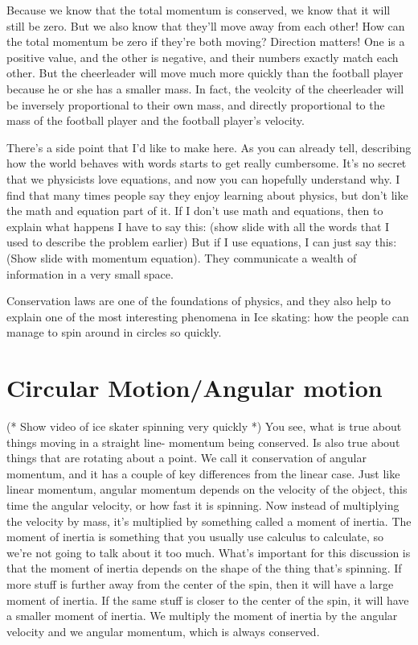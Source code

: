 \documentclass[12pt]{article}
\begin{document}
Because we know that the total momentum is conserved, we know that it will still be zero.
But we also know that they'll move away from each other! How can the total momentum be
zero if they're both moving? Direction matters! One is a positive value, and the other
is negative, and their numbers exactly match each other. 
But the cheerleader will move much more quickly
than the football player because he or she has a smaller mass. In fact, the veolcity 
of the cheerleader will be inversely proportional to their own mass, and directly 
proportional to the mass of the football player and the football player's velocity. 

There's a side point that I'd like to make here.
As you can already tell, describing how the world behaves with words starts to get 
really cumbersome. It's no secret that we physicists love equations, and now you
can hopefully understand why. I find that many times people say they enjoy learning
about physics, but don't like the math and equation part of it. If I don't use
math and equations, then to explain what happens I have to say this:
(show slide with all the words that I used to 
describe the problem earlier)
But if I use equations, I can just say this:
(Show slide with momentum equation). 
They communicate a wealth of information in a very 
small space. 

Conservation laws are one of the foundations of physics, and they also help to explain
one of the most interesting phenomena in Ice skating: how the people can manage to 
spin around in circles so quickly. 

\section{Circular Motion/Angular motion}
(* Show video of ice skater spinning very quickly *)
You see, what is true about things moving in a straight line- momentum being conserved. Is also 
true about things that are rotating about a point. We call it conservation of angular momentum,
and it has a couple of key differences from the linear case. Just like linear momentum, 
angular momentum depends on the velocity of the object, this time the angular velocity,
or how fast it is spinning. Now instead of multiplying the velocity by mass, it's
multiplied by something called a moment of inertia. The moment of inertia is something
that you usually use calculus to calculate, so we're not going to talk about it too much.
What's important for this discussion is that the moment of inertia depends on the shape
of the thing that's spinning. If more stuff is further away from the center of the spin, 
then it will have a large moment of inertia. If the same stuff is closer to the center
of the spin, it will have a smaller moment of inertia. We multiply the moment of inertia
by the angular velocity and we angular momentum, which is always conserved. 
\end{document}
